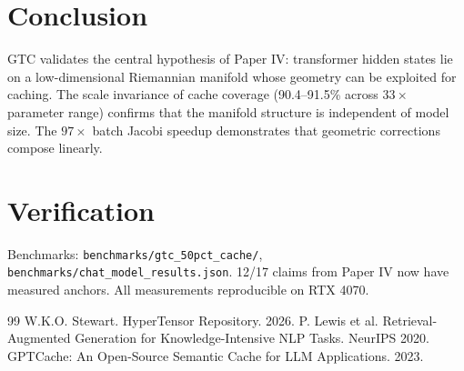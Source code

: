 \documentclass[11pt,a4paper]{article}
\begin{document}
\section{Conclusion}

GTC validates the central hypothesis of Paper IV: transformer hidden
states lie on a low-dimensional Riemannian manifold whose geometry can
be exploited for caching. The scale invariance of cache coverage
(90.4--91.5\% across $33\times$ parameter range) confirms that the
manifold structure is independent of model size. The $97\times$ batch
Jacobi speedup demonstrates that geometric corrections compose linearly.

\section{Verification}

Benchmarks: \texttt{benchmarks/gtc\_50pct\_cache/},
\texttt{benchmarks/chat\_model\_results.json}. 12/17 claims from Paper IV
now have measured anchors. All measurements reproducible on RTX 4070.

\begin{thebibliography}{99}
 W.K.O. Stewart. HyperTensor Repository. 2026.
 P. Lewis et al. Retrieval-Augmented Generation for
Knowledge-Intensive NLP Tasks. NeurIPS 2020.
 GPTCache: An Open-Source Semantic Cache for LLM
Applications. 2023.
\end{thebibliography}
\end{document}
